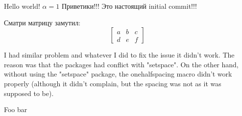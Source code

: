 \documentclass[a4paper,14pt,russian]{extreport}
\begin{document}
Hello world! \newline
    $\alpha = 1$ \newline
    Приветики!!!
    Это настоящий initial commit!!! 

    Сматри матрицу замутил:
    \[
    \begin{bmatrix}
        a & b & c \\
        d & e & f
    \end{bmatrix}
    \]

    I had similar problem and whatever I did to fix the issue it didn't work. The reason was that the packages had conflict with "setspace". On the other hand, without using the "setspace" package, the onehalfspacing macro didn't work properly (although it didn't complain, but the spacing was not as it was supposed to be).

    \newpage
    Foo bar
\end{document}
